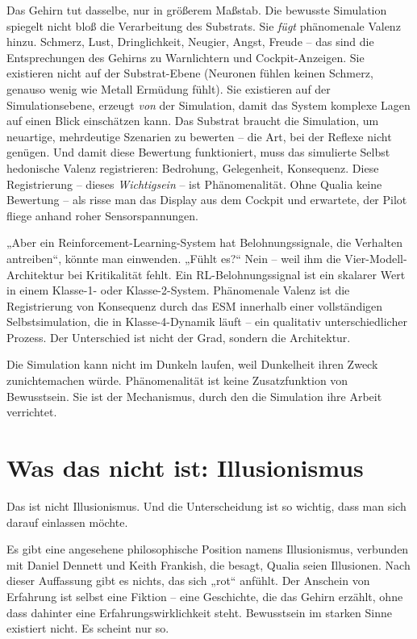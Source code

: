 \documentclass[11pt, twoside, openright]{book}
\begin{document}
Das Gehirn tut dasselbe, nur in größerem Maßstab. Die bewusste Simulation spiegelt nicht bloß die Verarbeitung des Substrats. Sie \textit{fügt} phänomenale Valenz hinzu. Schmerz, Lust, Dringlichkeit, Neugier, Angst, Freude -- das sind die Entsprechungen des Gehirns zu Warnlichtern und Cockpit-Anzeigen. Sie existieren nicht auf der Substrat-Ebene (Neuronen fühlen keinen Schmerz, genauso wenig wie Metall Ermüdung fühlt). Sie existieren auf der Simulationsebene, erzeugt \textit{von} der Simulation, damit das System komplexe Lagen auf einen Blick einschätzen kann. Das Substrat braucht die Simulation, um neuartige, mehrdeutige Szenarien zu bewerten -- die Art, bei der Reflexe nicht genügen. Und damit diese Bewertung funktioniert, muss das simulierte Selbst hedonische Valenz registrieren: Bedrohung, Gelegenheit, Konsequenz. Diese Registrierung -- dieses \textit{Wichtigsein} -- ist Phänomenalität. Ohne Qualia keine Bewertung -- als risse man das Display aus dem Cockpit und erwartete, der Pilot fliege anhand roher Sensorspannungen.

„Aber ein Reinforcement-Learning-System hat Belohnungssignale, die Verhalten antreiben“, könnte man einwenden. „Fühlt es?“ Nein -- weil ihm die Vier-Modell-Architektur bei Kritikalität fehlt. Ein RL-Belohnungssignal ist ein skalarer Wert in einem Klasse-1- oder Klasse-2-System. Phänomenale Valenz ist die Registrierung von Konsequenz durch das ESM innerhalb einer vollständigen Selbstsimulation, die in Klasse-4-Dynamik läuft -- ein qualitativ unterschiedlicher Prozess. Der Unterschied ist nicht der Grad, sondern die Architektur.

Die Simulation kann nicht im Dunkeln laufen, weil Dunkelheit ihren Zweck zunichtemachen würde. Phänomenalität ist keine Zusatzfunktion von Bewusstsein. Sie ist der Mechanismus, durch den die Simulation ihre Arbeit verrichtet.

\section*{Was das nicht ist: Illusionismus}

Das ist nicht Illusionismus. Und die Unterscheidung ist so wichtig, dass man sich darauf einlassen möchte.

Es gibt eine angesehene philosophische Position namens Illusionismus, verbunden mit Daniel Dennett und Keith Frankish, die besagt, Qualia seien Illusionen. Nach dieser Auffassung gibt es nichts, das sich „rot“ anfühlt. Der Anschein von Erfahrung ist selbst eine Fiktion -- eine Geschichte, die das Gehirn erzählt, ohne dass dahinter eine Erfahrungswirklichkeit steht. Bewusstsein im starken Sinne existiert nicht. Es scheint nur so.
\end{document}
